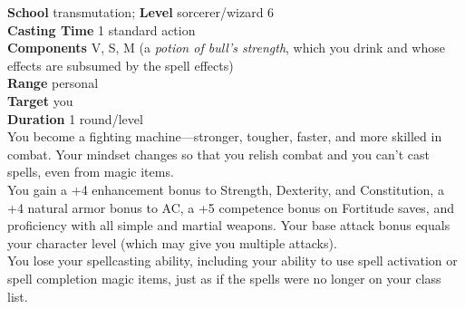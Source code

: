 \textbf{School} transmutation; \textbf{Level} sorcerer/wizard 6\\
\textbf{Casting Time} 1 standard action\\
\textbf{Components} V, S, M (a \textit{potion of bull's strength}, which you drink and whose effects are subsumed by the spell effects)\\
\textbf{Range} personal\\
\textbf{Target} you\\
\textbf{Duration} 1 round/level\\
You become a fighting machine---stronger, tougher, faster, and more skilled in combat. Your mindset changes so that you relish combat and you can't cast spells, even from magic items.\\
You gain a +4 enhancement bonus to Strength, Dexterity, and Constitution, a +4 natural armor bonus to AC, a +5 competence bonus on Fortitude saves, and proficiency with all simple and martial weapons. Your base attack bonus equals your character level (which may give you multiple attacks).\\
You lose your spellcasting ability, including your ability to use spell activation or spell completion magic items, just as if the spells were no longer on your class list.\\
